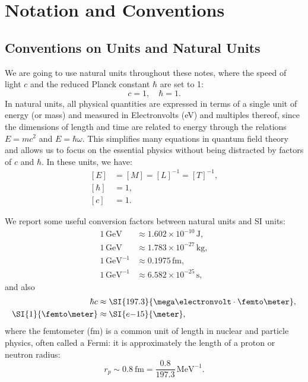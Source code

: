 \section{Notation and Conventions} \label{app:notation}

\subsection*{Conventions on Units and Natural Units}

We are going to use natural units throughout these notes, where the speed of light \(c\) and the reduced Planck constant \(\hbar\) are set to 1:
\[
    c = 1, \quad \hbar = 1.
\]
In natural units, all physical quantities are expressed in terms of a single unit of energy (or mass) and measured in Electronvolts (\si{\electronvolt}) and multiples thereof, since the dimensions of length and time are related to energy through the relations \(E = mc^2\) and \(E = \hbar \omega\). This simplifies many equations in quantum field theory and allows us to focus on the essential physics without being distracted by factors of \(c\) and \(\hbar\). In these units, we have:
\[
    \begin{aligned}
        [E]     & = [M] = [L]^{-1} = [T]^{-1}, \\
        [\hbar] & = 1,                         \\
        [c]     & = 1.
    \end{aligned}
\]

We report some useful conversion factors between natural units and SI units:
\[
    \begin{aligned}
        1 \, \text{GeV}      & \approx 1.602 \times 10^{-10} \, \text{J},  \\
        1 \, \text{GeV}      & \approx 1.783 \times 10^{-27} \, \text{kg}, \\
        1 \, \text{GeV}^{-1} & \approx 0.1975 \, \text{fm},                \\
        1 \, \text{GeV}^{-1} & \approx 6.582 \times 10^{-25} \, \text{s},
    \end{aligned}
\]
and also
\[
    \begin{aligned}
        \hbar c              & \approx \SI{197.3}{\mega\electronvolt \cdot \femto\meter}, \\
        \SI{1}{\femto\meter} & \approx \SI{e{-15}}{\meter},
    \end{aligned}
\]
where the femtometer (\si{\femto\meter}) is a common unit of length in nuclear and particle physics, often called a Fermi: it is approximately the length of a proton or neutron radius:
\[
    r_p \sim \SI{0.8}{\femto\meter} = \frac{0.8}{197.3} \, \si{\mega\electronvolt}^{-1}.
\]

